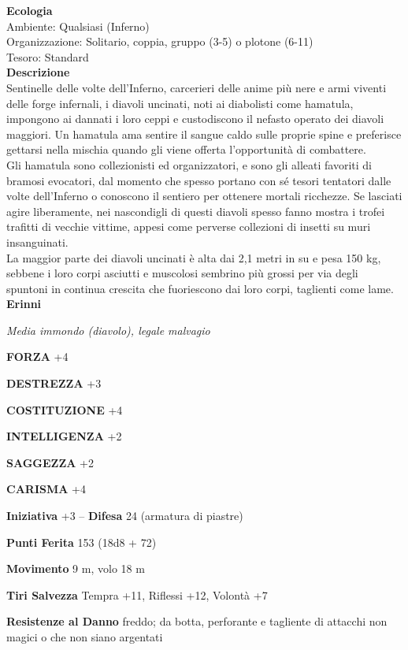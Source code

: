 \begin{multicols}{2}
\textbf{Ecologia}\\
Ambiente: Qualsiasi (Inferno)\\
Organizzazione: Solitario, coppia, gruppo (3-5) o plotone (6-11)\\
Tesoro: Standard\\
\textbf{Descrizione}\\
Sentinelle delle volte dell'Inferno, carcerieri delle anime più nere e armi viventi delle forge infernali, i diavoli uncinati, noti ai diabolisti come hamatula, impongono ai dannati i loro ceppi e custodiscono il nefasto operato dei diavoli maggiori. Un hamatula ama sentire il sangue caldo sulle proprie spine e preferisce gettarsi nella mischia quando gli viene offerta l'opportunità di combattere.\\
Gli hamatula sono collezionisti ed organizzatori, e sono gli alleati favoriti di bramosi evocatori, dal momento che spesso portano con sé tesori tentatori dalle volte dell'Inferno o conoscono il sentiero per ottenere mortali ricchezze. Se lasciati agire liberamente, nei nascondigli di questi diavoli spesso fanno mostra i trofei trafitti di vecchie vittime, appesi come perverse collezioni di insetti su muri insanguinati.\\
La maggior parte dei diavoli uncinati è alta dai 2,1 metri in su e pesa 150 kg, sebbene i loro corpi asciutti e muscolosi sembrino più grossi per via degli spuntoni in continua crescita che fuoriescono dai loro corpi, taglienti come lame.\\


\medskip{}\textbf{Erinni}

\emph{Media immondo (diavolo), legale malvagio}

\textbf{FORZA} +4

\textbf{DESTREZZA} +3

\textbf{COSTITUZIONE} +4

\textbf{INTELLIGENZA} +2

\textbf{SAGGEZZA} +2

\textbf{CARISMA} +4

\textbf{Iniziativa} +3 -- \textbf{Difesa} 24 (armatura di piastre)

\textbf{Punti Ferita} 153 (18d8 + 72)

\textbf{Movimento} 9 m, volo 18 m

\textbf{Tiri Salvezza} Tempra +11, Riflessi +12, Volontà +7

\textbf{Resistenze al Danno} freddo; da botta, perforante e tagliente di attacchi non magici o che non siano argentati


\end{multicols}
